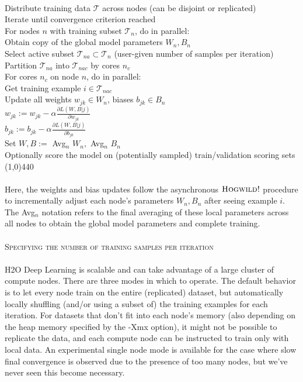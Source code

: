 \documentclass[12pt]{article}
\begin{document}
\\
Distribute training data $\mathcal{T}$ across nodes (can be disjoint or replicated)
\\
Iterate until convergence criterion reached
\\
\indent For nodes $n$ with training subset $\mathcal{T}_n$, do in parallel:
\\
\indent \indent Obtain copy of the global model parameters $W_n, B_n$
\\
\indent \indent Select active subset $\mathcal{T}_{na} \subset \mathcal{T}_n$ (user-given number of samples per iteration)
\\
\indent \indent Partition $\mathcal{T}_{na}$ into $\mathcal{T}_{nac}$ by cores $n_c$
\\
\indent \indent For cores $n_c$ on node $n$, do in parallel:
\\
\indent \indent \indent Get training example $i \in \mathcal{T}_{nac}$
\\
\indent \indent \indent  Update all weights $w_{jk} \in W_n$, biases $b_{jk} \in B_n$
\\
\indent \indent \indent  \indent $w_{jk} := w_{jk} - \alpha \frac{\partial L(W,B | j)}{\partial w_{jk}}$
\\
\indent \indent \indent  \indent $b_{jk} := b_{jk} - \alpha \frac{\partial L(W,B | j)}{\partial b_{jk}}$
\\
\indent Set $W,B := $ Avg$_n$ $W_n,$ $ $Avg$_n$ $B_n$
\\
\indent Optionally score the model on (potentially sampled) train/validation scoring sets
\\
\line(1,0){440}
\\
\\
Here, the weights and bias updates follow the asynchronous  $\textsc{Hogwild!}$ procedure to incrementally adjust each node's parameters $W_n,B_n$ after seeing example $i$. The Avg$_n$ notation refers to the final averaging of these local parameters across all nodes to obtain the global model parameters and complete training.
\\
\\
\noindent
\textsc{Specifying the number of training samples per iteration}
\\
\\
H2O Deep Learning is scalable and can take advantage of a large cluster of compute nodes. There are three modes in which to operate. The default behavior is to let every node train on the entire (replicated) dataset, but automatically locally shuffling (and/or using a subset of) the training examples for each iteration. For datasets that don't fit into each node's memory (also depending on the heap memory specified by the -Xmx option), it might not be possible to replicate the data, and each compute node can be instructed to train only with local data. An experimental single node mode is available for the case where slow final convergence is observed due to the presence of too many nodes, but we've never seen this become necessary.
\end{document}
